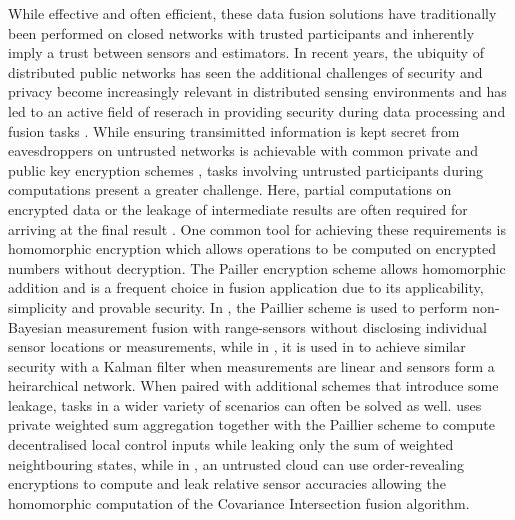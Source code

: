 \documentclass[letterpaper, 10 pt, conference]{ieeeconf}
\begin{document}
While effective and often efficient, these data fusion solutions have traditionally been performed on closed networks with trusted participants and inherently imply a trust between sensors and estimators. In recent years, the ubiquity of distributed public networks has seen the additional challenges of security and privacy become increasingly relevant in distributed sensing environments and has led to an active field of reserach in providing security during data processing and fusion tasks \cite{renSecurityChallengesPublic2012,brennerSecretProgramExecution2011}. While ensuring transimitted information is kept secret from eavesdroppers on untrusted networks is achievable with common private and public key encryption schemes \cite{katzIntroductionModernCryptography2008}, tasks involving untrusted participants during computations present a greater challenge. Here, partial computations on encrypted data or the leakage of intermediate results are often required for arriving at the final result \cite{risticSecureFastCovariance2021,shiPrivacyPreservingAggregationTimeSeries2011}. One common tool for achieving these requirements is homomorphic encryption \cite{gentryFullyHomomorphicEncryption2009,paillierPublicKeyCryptosystemsBased1999} which allows operations to be computed on encrypted numbers without decryption. The Pailler encryption scheme \cite{paillierPublicKeyCryptosystemsBased1999} allows homomorphic addition and is a frequent choice in fusion application due to its applicability, simplicity and provable security. In \cite{alanwarPrOLocResilientLocalization2017}, the Paillier scheme is used to perform non-Bayesian measurement fusion with range-sensors without disclosing individual sensor locations or measurements, while in \cite{aristovEncryptedMultisensorInformation2018}, it is used in to achieve similar security with a Kalman filter when measurements are linear and sensors form a heirarchical network. When paired with additional schemes that introduce some leakage, tasks in a wider variety of scenarios can often be solved as well. \cite{alexandruEncryptedCooperativeControl2019} uses private weighted sum aggregation together with the Paillier scheme to compute decentralised local control inputs while leaking only the sum of weighted neightbouring states, while in \cite{risticSecureFastCovariance2021}, an untrusted cloud can use order-revealing encryptions to compute and leak relative sensor accuracies allowing the homomorphic computation of the Covariance Intersection fusion algorithm.
\end{document}
